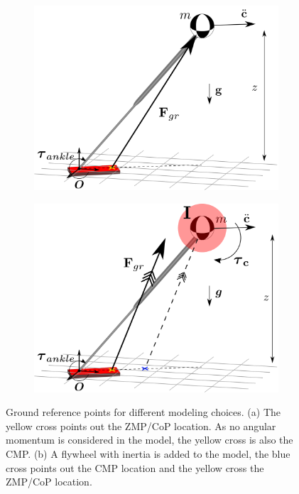 \begin{figure}[h]
\centering
\begin{subfigure}{0.49\textwidth}
\centering
\includegraphics[width=.95\linewidth]{STYLESTUFF/3DCoPviz.png}
\caption{}
\label{fig:3dlipfoot}
\end{subfigure}
\begin{subfigure}{0.49\textwidth}
\centering
\includegraphics[width=.95\linewidth]{STYLESTUFF/3DCMPCoPviz.png}	
\caption{}
\label{fig:3dlipfootinertia}
\end{subfigure}
\caption{Ground reference points for different modeling choices. (a) The yellow cross points out the \ac{ZMP}/\ac{CoP} location. As no angular momentum is considered in the model,  the yellow cross is also the \ac{CMP}. (b) A flywheel with inertia is added to the model, the blue cross points out the \ac{CMP} location and the yellow cross the \ac{ZMP}/\ac{CoP} location.}
\label{fig:zmpvscmp}
\end{figure}


